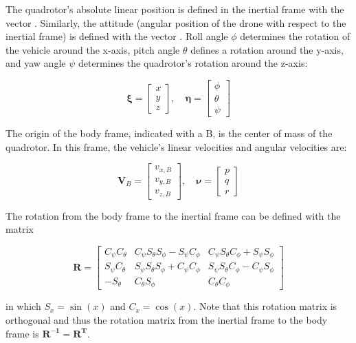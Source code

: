 \documentclass[letterpaper, 10 pt, conference]{ieeeconf}  %
\begin{document}
The quadrotor's absolute linear position is defined in the inertial frame with the vector \bm{$\xi$}. Similarly, the attitude (angular position of the drone with respect to the inertial frame) is defined with the vector \bm{$\eta$}. Roll angle $\phi$ determines the rotation of the vehicle around the x-axis, pitch angle $\theta$ defines a rotation around the y-axis, and yaw angle $\psi$ determines the quadrotor's rotation around the z-axis:


$$\bm{\xi}=\left[ \begin{array}{l}{x} \\ {y} \\ {z}\end{array}\right],
\quad \bm{\eta}=\left[ \begin{array}{l}{\phi} \\ {\theta} \\ {\psi}\end{array}\right]$$

The origin of the body frame, indicated with a B, is the center of mass of the quadrotor. In this frame, the vehicle's linear velocities  and angular velocities \bm{$\nu$} are:

$$\bm{V}_{B}=\left[ \begin{array}{c}{v_{x, B}} \\ {v_{y, B}} \\ {v_{z, B}}\end{array}\right], \quad \bm{\nu}=\left[ \begin{array}{l}{p} \\ {q} \\ {r}\end{array}\right]$$


The rotation from the body frame to the inertial frame can be defined with the matrix

$$\bm{R}=\left[ \begin{array}{ccc}{C_{\psi} C_{\theta}} & {C_{\psi} S_{\theta} S_{\phi}-S_{\psi} C_{\phi}} & {C_{\psi} S_{\theta} C_{\phi}+S_{\psi} S_{\phi}} \\ {S_{\psi} C_{\theta}} & {S_{\psi} S_{\theta} S_{\phi}+C_{\psi} C_{\phi}} & {S_{\psi} S_{\theta} C_{\phi}-C_{\psi} S_{\phi}} \\ {-S_{\theta}} & {C_{\theta} S_{\phi}} & {C_{\theta} C_{\phi}}\end{array}\right]$$

in which $S_{x}=\sin (x)$ and $C_{x}=\cos (x)$. Note that this rotation matrix is orthogonal and thus the rotation matrix from the inertial frame to the body frame is $\bm{R^{-1} = \bm{R^T}}$.
\end{document}
